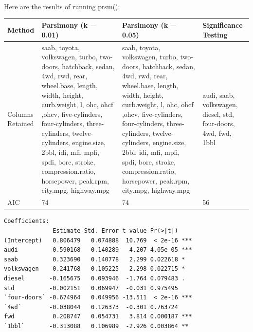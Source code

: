\documentclass[letter]{article}
\begin{document}
Here are the results of running prsm():\\
\begin{center}
    \begin{tabular}{ | l |  p{4cm} |  p{4cm} | p{4cm} |}
    \hline
    Method & Parsimony (k = 0.01) & Parsimony (k = 0.05) & Significance Testing \\ \hline
    	
    Columns Retained & saab, toyota, volkswagen, turbo, two-doors, hatchback, sedan, 4wd, rwd, rear, wheel.base, length, width, height, curb.weight, l, ohc, ohcf ,ohcv, five-cylinders, four-cylinders, three-cylinders, twelve-cylinders, engine.size, 2bbl, idi, mfi, mpfi, spdi, bore, stroke, compression.ratio, horsepower, peak.rpm, city.mpg, highway.mpg & saab, toyota, volkswagen, turbo, two-doors, hatchback, sedan, 4wd, rwd, rear, wheel.base, length, width, height, curb.weight, l, ohc, ohcf ,ohcv, five-cylinders, four-cylinders, three-cylinders, twelve-cylinders, engine.size, 2bbl, idi, mfi, mpfi, spdi, bore, stroke, compression.ratio, horsepower, peak.rpm, city.mpg, highway.mpg & audi, saab, volkswagen, diesel, std, four-doors, 4wd, fwd, 1bbl\\ \hline
    
    AIC & 74 & 74 & 56\\ \hline
    
    \end{tabular}
\end{center}



\begin{verbatim}
Coefficients:
              Estimate Std. Error t value Pr(>|t|)    
(Intercept)   0.806479   0.074888  10.769  < 2e-16 ***
audi          0.590168   0.140289   4.207 4.05e-05 ***
saab          0.323690   0.140778   2.299 0.022618 *  
volkswagen    0.241768   0.105225   2.298 0.022715 *  
diesel       -0.165675   0.093946  -1.764 0.079483 .  
std          -0.002151   0.069947  -0.031 0.975495    
`four-doors` -0.674964   0.049956 -13.511  < 2e-16 ***
`4wd`        -0.038044   0.126373  -0.301 0.763724    
fwd           0.208747   0.054731   3.814 0.000187 ***
`1bbl`       -0.313088   0.106989  -2.926 0.003864 ** 

\end{verbatim}
\end{document}
